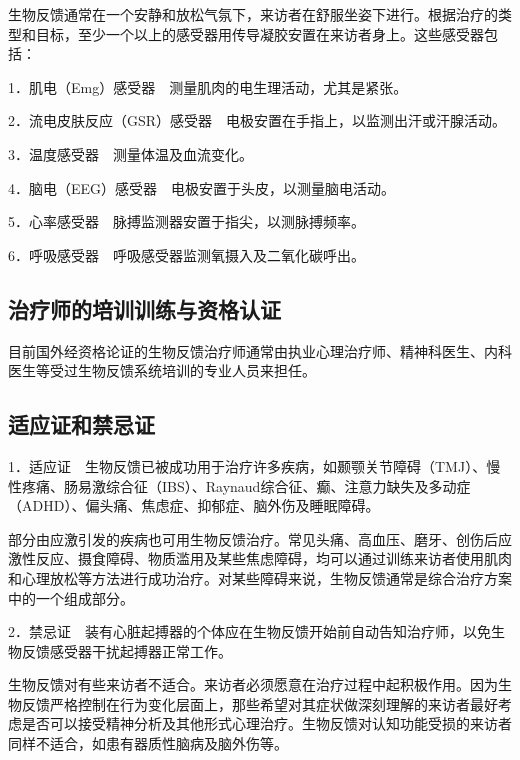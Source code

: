 生物反馈通常在一个安静和放松气氛下，来访者在舒服坐姿下进行。根据治疗的类型和目标，至少一个以上的感受器用传导凝胶安置在来访者身上。这些感受器包括：

1．肌电（Emg）感受器　测量肌肉的电生理活动，尤其是紧张。

2．流电皮肤反应（GSR）感受器　电极安置在手指上，以监测出汗或汗腺活动。

3．温度感受器　测量体温及血流变化。

4．脑电（EEG）感受器　电极安置于头皮，以测量脑电活动。

5．心率感受器　脉搏监测器安置于指尖，以测脉搏频率。

6．呼吸感受器　呼吸感受器监测氧摄入及二氧化碳呼出。

\subsection{治疗师的培训训练与资格认证}

目前国外经资格论证的生物反馈治疗师通常由执业心理治疗师、精神科医生、内科医生等受过生物反馈系统培训的专业人员来担任。

\subsection{适应证和禁忌证}

1．适应证　生物反馈已被成功用于治疗许多疾病，如颞颚关节障碍（TMJ）、慢性疼痛、肠易激综合征（IBS）、Raynaud综合征、癫、注意力缺失及多动症（ADHD）、偏头痛、焦虑症、抑郁症、脑外伤及睡眠障碍。

部分由应激引发的疾病也可用生物反馈治疗。常见头痛、高血压、磨牙、创伤后应激性反应、摄食障碍、物质滥用及某些焦虑障碍，均可以通过训练来访者使用肌肉和心理放松等方法进行成功治疗。对某些障碍来说，生物反馈通常是综合治疗方案中的一个组成部分。

2．禁忌证　装有心脏起搏器的个体应在生物反馈开始前自动告知治疗师，以免生物反馈感受器干扰起搏器正常工作。

生物反馈对有些来访者不适合。来访者必须愿意在治疗过程中起积极作用。因为生物反馈严格控制在行为变化层面上，那些希望对其症状做深刻理解的来访者最好考虑是否可以接受精神分析及其他形式心理治疗。生物反馈对认知功能受损的来访者同样不适合，如患有器质性脑病及脑外伤等。